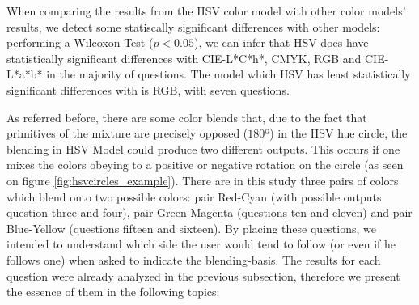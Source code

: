 %
When comparing the results from the HSV color model with other color models' results, we detect some statiscally significant differences with other models: performing a Wilcoxon Test ($p < 0.05$), we can infer that HSV does
have statistically significant differences with CIE-L*C*h*, CMYK, RGB and CIE-L*a*b* in the majority of questions. The model which HSV has least statistically significant differences with is RGB, with seven questions. \par
%
As referred before, there are some color blends that, due to the fact that primitives of the mixture are precisely opposed ($180º$) in the HSV hue circle, the blending in HSV Model could produce two different outputs.
This occurs if one mixes the colors obeying to a positive or negative rotation on the circle (as seen on figure \ref{fig:hsvcircles_example}). There are in this study three pairs of colors which blend onto two possible
colors: pair Red-Cyan (with possible outputs question three and four), pair Green-Magenta (questions ten and eleven) and pair Blue-Yellow (questions fifteen and sixteen). By placing these questions, we intended to
understand which side the user would tend to follow (or even if he follows one) when asked to indicate the blending-basis. The results for each question were already analyzed in the previous subsection, therefore we
present the essence of them in the following topics:
%
